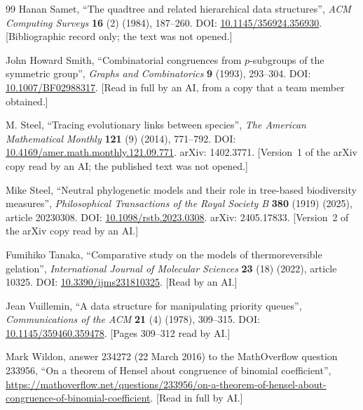 \documentclass[11pt]{article}
\theoremstyle{definition}
\theoremstyle{remark}
\numberwithin{equation}{section}
\numberwithin{figure}{section}
\begin{document}
\begin{thebibliography}{99}
Hanan Samet, ``The quadtree and related hierarchical data structures'', \emph{ACM Computing Surveys}
\textbf{16} (2) (1984), 187--260. DOI: \href{https://doi.org/10.1145/356924.356930}{10.1145/356924.356930}.
[Bibliographic record only; the text was not opened.]

John Howard Smith, ``Combinatorial congruences from $p$-subgroups of the symmetric group'', \emph{Graphs and
Combinatorics} \textbf{9} (1993), 293--304. DOI:
\href{https://doi.org/10.1007/BF02988317}{10.1007/BF02988317}. [Read in full by an AI, from a copy that a
team member obtained.]

M. Steel, ``Tracing evolutionary links between species'', \emph{The American Mathematical Monthly}
\textbf{121} (9) (2014), 771--792. DOI:
\href{https://doi.org/10.4169/amer.math.monthly.121.09.771}{10.4169/amer.math.monthly.121.09.771}. arXiv:
1402.3771. [Version~1 of the arXiv copy read by an AI; the published text was not opened.]

Mike Steel, ``Neutral phylogenetic models and their role in tree-based biodiversity measures'',
\emph{Philosophical Transactions of the Royal Society B} \textbf{380} (1919) (2025), article 20230308. DOI:
\href{https://doi.org/10.1098/rstb.2023.0308}{10.1098/rstb.2023.0308}. arXiv: 2405.17833. [Version~2 of the
arXiv copy read by an AI.]

Fumihiko Tanaka, ``Comparative study on the models of thermoreversible gelation'', \emph{International
Journal of Molecular Sciences} \textbf{23} (18) (2022), article 10325. DOI:
\href{https://doi.org/10.3390/ijms231810325}{10.3390/ijms231810325}. [Read by an AI.]

Jean Vuillemin, ``A data structure for manipulating priority queues'', \emph{Communications of the ACM}
\textbf{21} (4) (1978), 309--315. DOI: \href{https://doi.org/10.1145/359460.359478}{10.1145/359460.359478}.
[Pages 309--312 read by AI.]

Mark Wildon, answer 234272 (22 March 2016) to the MathOverflow question 233956, ``On a theorem of Hensel
about congruence of binomial coefficient'',
\url{https://mathoverflow.net/questions/233956/on-a-theorem-of-hensel-about-congruence-of-binomial-coefficient}.
[Read in full by AI.]
\end{thebibliography}


\appendix
\end{document}
